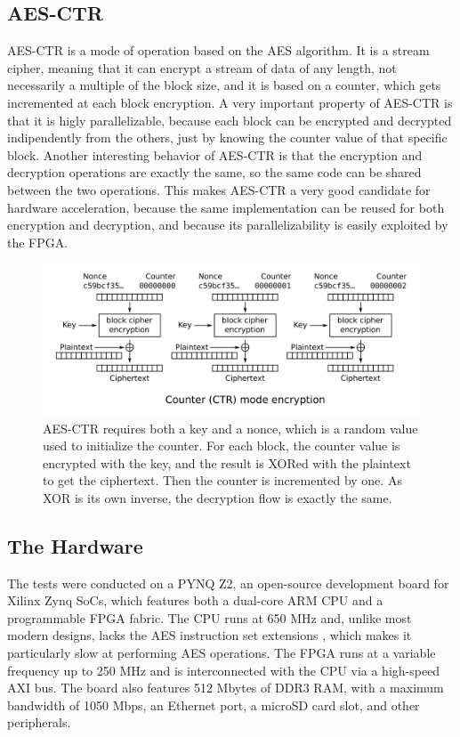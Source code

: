 \documentclass[12pt,oneside,a4paper]{article}
\begin{document}
\subsection{AES-CTR} \label{subsec:aes-ctr}
AES-CTR \cite{aes:ctr} is a mode of operation based on the AES algorithm. It is a stream cipher, meaning that it can encrypt a stream of data of any length, not necessarily a multiple of the block size, and it is based on a counter, which gets incremented at each block encryption.
A very important property of AES-CTR is that it is higly parallelizable, because each block can be encrypted and decrypted indipendently from the others, just by knowing the counter value of that specific block.
Another interesting behavior of AES-CTR is that the encryption and decryption operations are exactly the same, so the same code can be shared between the two operations.
This makes AES-CTR a very good candidate for hardware acceleration, because the same implementation can be reused for both encryption and decryption, and because its parallelizability is easily exploited by the FPGA.
\begin{figure}[h!]
	\centering
	\includegraphics[width=\textwidth]{CTR_encryption_scheme.png}
	\caption{AES-CTR requires both a key and a nonce, which is a random value used to initialize the counter. For each block, the counter value is encrypted with the key, and the result is XORed with the plaintext to get the ciphertext. Then the counter is incremented by one. As XOR is its own inverse, the decryption flow is exactly the same. \cite{pic:aes-ctr}}
\end{figure}

\subsection{The Hardware} \label{subsec:the-hardware}
The tests were conducted on a PYNQ Z2, an open-source development board for Xilinx Zynq SoCs, which features both a dual-core ARM CPU and a programmable FPGA fabric.
The CPU runs at 650 MHz and, unlike most modern designs, lacks the AES instruction set extensions \cite {aes:arm-extensions}, which makes it particularly slow at performing AES operations.
The FPGA runs at a variable frequency up to 250 MHz and is interconnected with the CPU via a high-speed AXI bus.
The board also features 512 Mbytes of DDR3 RAM, with a maximum bandwidth of 1050 Mbps, an Ethernet port, a microSD card slot, and other peripherals.
\end{document}
